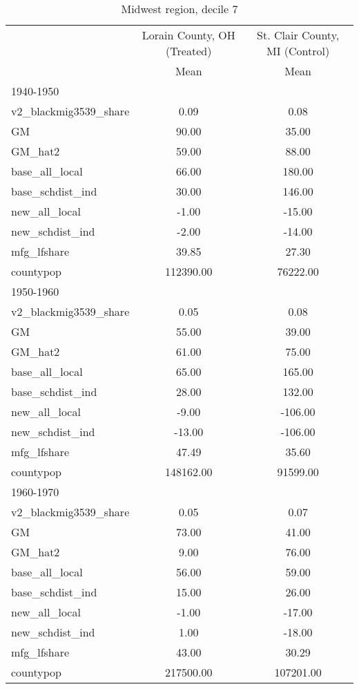 \begin{table}[htbp]\centering
\def\sym#1{\ifmmode^{#1}\else\(^{#1}\)\fi}
\caption{Midwest region, decile 7 \label{tab1}}
\begin{tabular}{l*{2}{c}}
\toprule
                    &\multicolumn{1}{c}{Lorain County, OH (Treated)}&\multicolumn{1}{c}{St. Clair County, MI (Control)}\\
                    &        Mean&        Mean\\
\midrule
1940-1950           &            &            \\
v2\_blackmig3539\_share&        0.09&        0.08\\
GM                  &       90.00&       35.00\\
GM\_hat2             &       59.00&       88.00\\
base\_all\_local      &       66.00&      180.00\\
base\_schdist\_ind    &       30.00&      146.00\\
new\_all\_local       &       -1.00&      -15.00\\
new\_schdist\_ind     &       -2.00&      -14.00\\
mfg\_lfshare         &       39.85&       27.30\\
countypop           &   112390.00&    76222.00\\
\midrule
1950-1960           &            &            \\
v2\_blackmig3539\_share&        0.05&        0.08\\
GM                  &       55.00&       39.00\\
GM\_hat2             &       61.00&       75.00\\
base\_all\_local      &       65.00&      165.00\\
base\_schdist\_ind    &       28.00&      132.00\\
new\_all\_local       &       -9.00&     -106.00\\
new\_schdist\_ind     &      -13.00&     -106.00\\
mfg\_lfshare         &       47.49&       35.60\\
countypop           &   148162.00&    91599.00\\
\midrule
1960-1970           &            &            \\
v2\_blackmig3539\_share&        0.05&        0.07\\
GM                  &       73.00&       41.00\\
GM\_hat2             &        9.00&       76.00\\
base\_all\_local      &       56.00&       59.00\\
base\_schdist\_ind    &       15.00&       26.00\\
new\_all\_local       &       -1.00&      -17.00\\
new\_schdist\_ind     &        1.00&      -18.00\\
mfg\_lfshare         &       43.00&       30.29\\
countypop           &   217500.00&   107201.00\\
\bottomrule
\end{tabular}
\end{table}
